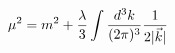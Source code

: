\begin{equation}\label{newmu}
\mu ^2=  m^2   + {\lambda \over 3} \int \frac{d^3 k}{(2\pi)^3} \frac{1}{2 |\vec k |}
\end{equation}

